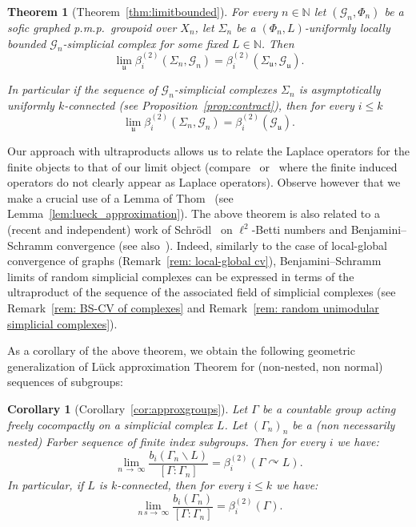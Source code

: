 \documentclass[10pt]{amsart}
\newtheorem{theo}[cdrthm]{Theorem}
\newtheorem{coro}[cdrthm]{Corollary}
\theoremstyle{definition}
\newcommand{\Nmath}{\mathbb{N}}
\newcommand{\acting}{\curvearrowright}
\newcommand{\cg}{\mathcal{G}}
\newcommand{\ul}{\mathfrak{u}}
\newcommand{\pmp}{p.m.p.\ }
\begin{document}
\begin{theo}[Theorem~\ref{thm:limitbounded}]
For every $n\in\Nmath$ let $(\cg_n,\Phi_n)$ be a \emph{sofic} graphed \pmp groupoid over $X_n$, let $\Sigma_n$ be a $(\Phi_n,L)$-uniformly locally bounded $\cg_n$-simplicial complex for some fixed $L\in\Nmath$. Then
\[
\lim_\ul\beta^{(2)}_i\left(\Sigma_n, \cg_n\right)=\beta^{(2)}_i\left(\Sigma_\ul,\cg_\ul\right).
\]

In particular if the sequence of $\cg_n$-simplicial complexes $\Sigma_n$ is asymptotically uniformly $k$-connected (see Proposition~\ref{prop:contract}), then for every $i\leq k$
\[
\lim_\ul\beta^{(2)}_i\left(\Sigma_n, \cg_n\right)=\beta^{(2)}_i(\cg_\ul).
\]
\end{theo}


Our approach with ultraproducts allows us to relate the Laplace operators for the finite objects to that of our limit object (compare~\cite[Proposition~6.1]{2005-Elek-Szabo-hyperlinearity} or~\cite{thom08} where the finite induced operators do not clearly appear as Laplace operators). Observe however that we make a crucial use of a Lemma of Thom~\cite{thom08} (see Lemma~\ref{lem:lueck_approximation}). The above theorem is also related to a (recent and independent) work of Schr\"odl~\cite{Schrodel-L2-Betti-simpl-cplx-2018} on $\ell^2$-Betti numbers and Benjamini--Schramm convergence (see also~\cite{Elek-10-Betti-test}). Indeed, similarly to the case of local-global convergence of graphs (Remark~\ref{rem: local-global cv}), Benjamini--Schramm limits of random simplicial complexes can be expressed in terms of the ultraproduct of the sequence of the associated field of simplicial complexes (see Remark~\ref{rem: BS-CV of complexes} and Remark~\ref{rem: random unimodular simplicial complexes}).

As a corollary of the above theorem, we obtain the following geometric generalization of L\"uck approximation Theorem for (non-nested, non normal) sequences of subgroups:
\begin{coro}[Corollary~\ref{cor:approxgroups}]
Let $\Gamma$ be a countable group acting freely cocompactly on a simplicial complex $L$. Let $(\Gamma_n)_n$ be a (non necessarily nested) Farber sequence of finite index subgroups. Then for every $i$ we have:
\[
\lim\limits_{n\,\to\,\infty}\frac{b_i(\Gamma_n\backslash L)}{[\Gamma:\Gamma_n]}=\beta^{(2)}_i(\Gamma\acting L).
\]
In particular, if $L$ is $k$-connected, then for every $i\leq k$ we have:
\[
\lim\limits_{n\,s\to\,\infty}\frac{b_i(\Gamma_n)}{[\Gamma:\Gamma_n]}=\beta^{(2)}_i(\Gamma).
\]
\end{coro}
\end{document}
